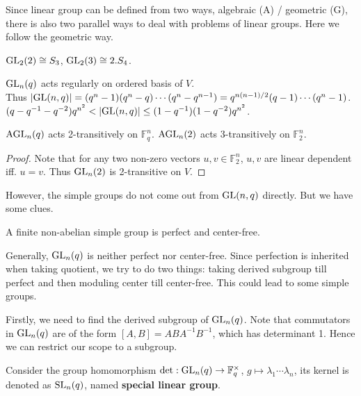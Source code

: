 \documentclass[a4paper,11pt]{article}
\begin{document}
Since linear group can be defined from two ways, algebraic (A) / geometric (G), there is also two parallel ways to deal with problems of linear groups. 
Here we follow the geometric way.

\begin{example}
    $\mathrm{GL}_2(2)\cong S_3$, $\mathrm{GL}_2(3)\cong 2.S_4$.
\end{example}

\begin{remark}
    $\mathrm{GL}_n(q)$ acts regularly on ordered basis of $V$. \\Thus
    $|\mathrm{GL}(n,q)|=(q^n-1)(q^n-q)\cdots(q^n-q^{n-1})=q^{n(n-1)/2}(q-1)\cdots(q^n-1)$.\\
    $(q-q^{-1}-q^{-2})q^{n^2} < |\mathrm{GL}(n,q)|\leq (1-q^{-1})(1-q^{-2})q^{n^2}$.
\end{remark}

\begin{corollary}
    $\mathrm{AGL}_n(q)$ acts 2-transitively on $\mathbb{F}_q^n$. $\mathrm{AGL}_n(2)$ acts 3-transitively on $\mathbb{F}_2^n$. 
\end{corollary}
\begin{proof}
    Note that for any two non-zero vectors $u,v\in\mathbb{F}_2^n$, $u,v$ are linear dependent iff. $u=v$. Thus $\mathrm{GL}_n(2)$ is 2-transitive on $V$.
\end{proof}

However, the simple groups do not come out from $\mathrm{GL}(n,q)$ directly. But we have some clues.

\begin{proposition}
    A finite non-abelian simple group is perfect and center-free.
\end{proposition}

Generally, $\mathrm{GL}_n(q)$ is neither perfect nor center-free. Since perfection is inherited when taking quotient, we try to do two things: taking derived subgroup till perfect and then moduling center till center-free. This could lead to some simple groups.

Firstly, we need to find the derived subgroup of $\mathrm{GL}_n(q)$. Note that commutators in $\mathrm{GL}_n(q)$ are of the form $[A,B]=ABA^{-1}B^{-1}$, which has determinant 1. Hence we can restrict our scope to a subgroup.

\begin{definition}
    Consider the group homomorphism $\mathrm{det}:\mathrm{GL}_n(q)\to \mathbb{F}_q^\times$, $g\mapsto \lambda_1\cdots\lambda_n$, its kernel is denoted as $\mathrm{SL}_n(q)$, named \textbf{special linear group}.
\end{definition}
\end{document}
